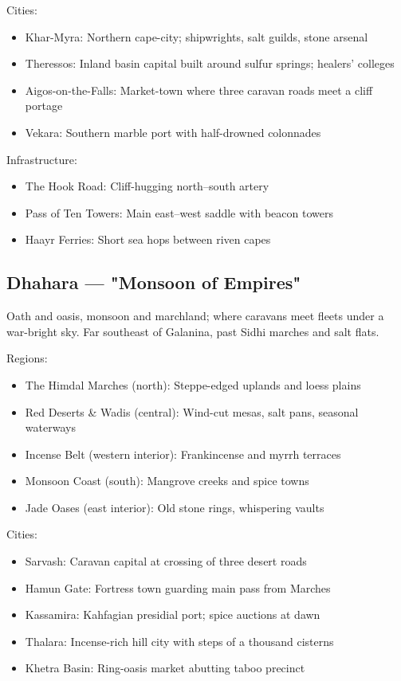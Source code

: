 Cities:
\begin{itemize}
    \item Khar-Myra: Northern cape-city; shipwrights, salt guilds, stone arsenal
    \item Theressos: Inland basin capital built around sulfur springs; healers' colleges
    \item Aigos-on-the-Falls: Market-town where three caravan roads meet a cliff portage
    \item Vekara: Southern marble port with half-drowned colonnades
\end{itemize}

Infrastructure:
\begin{itemize}
    \item The Hook Road: Cliff-hugging north–south artery
    \item Pass of Ten Towers: Main east–west saddle with beacon towers
    \item Haayr Ferries: Short sea hops between riven capes
\end{itemize}

\subsection{Dhahara — "Monsoon of Empires"}
\label{sec:dhahara}

Oath and oasis, monsoon and marchland; where caravans meet fleets under a war-bright sky. Far southeast of Galanina, past Sidhi marches and salt flats.

Regions:
\begin{itemize}
    \item The Himdal Marches (north): Steppe-edged uplands and loess plains
    \item Red Deserts \& Wadis (central): Wind-cut mesas, salt pans, seasonal waterways
    \item Incense Belt (western interior): Frankincense and myrrh terraces
    \item Monsoon Coast (south): Mangrove creeks and spice towns
    \item Jade Oases (east interior): Old stone rings, whispering vaults
\end{itemize}

Cities:
\begin{itemize}
    \item Sarvash: Caravan capital at crossing of three desert roads
    \item Hamun Gate: Fortress town guarding main pass from Marches
    \item Kassamira: Kahfagian presidial port; spice auctions at dawn
    \item Thalara: Incense-rich hill city with steps of a thousand cisterns
    \item Khetra Basin: Ring-oasis market abutting taboo precinct
\end{itemize}

